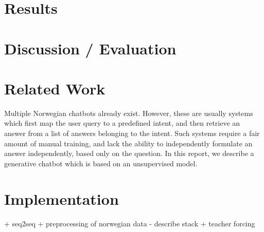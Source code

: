 \documentclass{article}
\begin{document}
\section{Results}


\section{Discussion / Evaluation}


\section{Related Work}

Multiple Norwegian chatbots already exist. However, these are usually systems
which first map the user query to a predefined intent, and then retrieve an
answer from a list of answers belonging to the intent. Such systems require a
fair amount of manual training, and lack the ability to independently formulate
an answer independently, based only on the question.  In this report, we
describe a generative chatbot which is based on an unsupervised model.

\section{Implementation}

+ seq2seq + preprocessing of norwegian data - describe stack + teacher forcing

\end{document}
